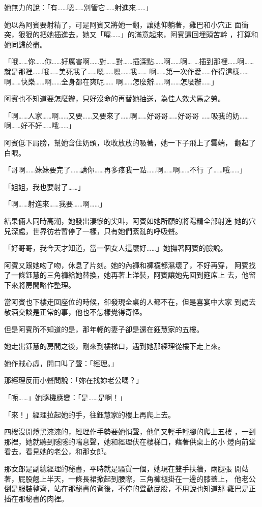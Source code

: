 她無力的說：「有……嗯……別管它……射進來……」

她以為阿賓要射精了，可是阿賓又將她一翻，讓她仰躺著，雞巴和小穴正
面衝突，狠狠的把她插進去，她又「喔……」的滿意起來，阿賓這回埋頭苦幹
，打算和她同歸於盡。

「哦……你……你……好厲害啊……對……對……插深點……啊……啊…
…插到那裡……啊……就是那裡……哦……美死我了……嗯……嗯……我……
啊……第一次作愛……作得這樣……啊……快樂……啊……全身都在爽呢……
啊……怎麼辦……啊……怎麼辦……」

阿賓也不知道要怎麼辦，只好沒命的再替她抽送，為佳人效犬馬之勞。

「啊……人家……啊……又要……又要來了……啊……好哥哥……好哥哥
……吸我的奶……啊……好不好……哦……」

阿賓低下肩膀，幫她含住奶頭，收收放放的吸著，她一下子飛上了雲端，
翻起了白眼。

「哥啊……妹妹要完了……請你……再多疼我一點……啊……啊……不行
了……哦……」

「姐姐，我也要射了……」

「啊……射進來……我要……啊……」

結果倆人同時高潮，她發出淒慘的尖叫，阿賓如她所願的將陽精全部射進
她的穴兒深處，世界彷若暫停了一樣，只有她們紊亂的呼吸聲。

「好哥哥，我今天才知道，當一個女人這麼好……」她撫著阿賓的臉說。

阿賓又跟她吻了吻，休息了片刻。她的內褲和褲襪都濕壞了，不好再穿，
阿賓找了一條鈺慧的三角褲給她替換，她再著上洋裝，阿賓讓她先回到筵席上
去，他留下來將房間略作整理。

當阿賓也下樓走回座位的時候，卻發現全桌的人都不在，但是喜宴中大家
到處去敬酒交談是正常的事，他也不怎樣覺得奇怪。

但是阿賓所不知道的是，那年輕的妻子卻是還在鈺慧家的五樓。

她走出鈺慧的房間之後，剛來到樓梯口，遇到她那經理從樓下走上來。

她作賊心虛，開口叫了聲：「經理。」

那經理反而小聲問說：「妳在找妳老公嗎？」

「呃……」她隨機應變：「是……是啊！」

「來！」經理拉起她的手，往鈺慧家的樓上再爬上去。

四樓沒開燈黑漆漆的，經理作手勢要她悄聲，他們又輕手輕腳的爬上五樓
，一到那裡，她就聽到隱隱的喘息聲，她和經理伏在樓梯口，藉著供桌上的小
燈向前堂看去，看見她的老公，和那女郎。

那女郎是副總經理的秘書，平時就是騷貨一個，她現在雙手扶牆，兩腿張
開站著，屁股翹上半天，一條長裙掀起到腰際，三角褲褪掛在一邊的膝蓋上，
他老公倒是服裝整齊，站在那秘書的背後，不停的聳動屁股，不用說也知道那
雞巴是正插在那秘書的肉裡。

